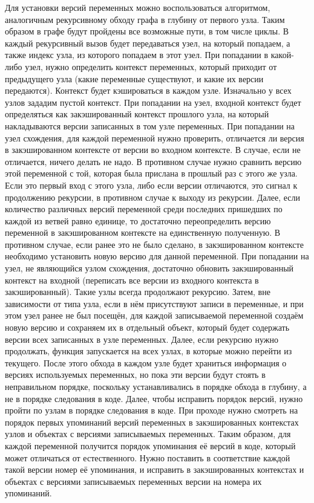 Для установки версий переменных можно воспользоваться алгоритмом, аналогичным рекурсивному обходу графа в глубину от первого узла. Таким образом в графе будут пройдены все возможные пути, в том числе циклы. В каждый рекурсивный вызов будет передаваться узел, на который попадаем, а также индекс узла, из которого попадаем в этот узел. При попадании в какой-либо узел, нужно определить контекст переменных, который приходит от предыдущего узла (какие переменные существуют, и какие их версии передаются). Контекст будет кэшироваться в каждом узле. Изначально у всех узлов зададим пустой контекст. При попадании на узел, входной контекст будет определяться как закэшированный контекст прошлого узла, на который накладываются версии записанных в том узле переменных. При попадании на узел схождения, для каждой переменной нужно проверить, отличается ли версия в закэшированном контексте от версии во входном контексте. В случае, если не отличается, ничего делать не надо. В противном случае нужно сравнить версию этой переменной с той, которая была прислана в прошлый раз с этого же узла. Если это первый вход с этого узла, либо если версии отличаются, это сигнал к продолжению рекурсии, в противном случае к выходу из рекурсии. Далее, если количество различных версий переменной среди последних пришедших по каждой из ветвей равно единице, то достаточно переопределить версию переменной в закэшированном контексте на единственную полученную. В противном случае, если ранее это не было сделано, в закэшированном контексте необходимо установить новую версию для данной переменной. При попадании на узел, не являющийся узлом схождения, достаточно обновить закэшированный контекст на входной (переписать все версии из входного контекста в закэшированный). Такие узлы всегда продолжают рекурсию. Затем, вне зависимости от типа узла, если в нём присутствуют записи в переменные, и при этом узел ранее не был посещён, для каждой записываемой переменной создаём новую версию и сохраняем их в отдельный объект, который будет содержать версии всех записанных в узле переменных. Далее, если рекурсию нужно продолжать, функция запускается на всех узлах, в которые можно перейти из текущего. После этого обхода в каждом узле будет храниться информация о версиях используемых переменных, но пока эти версии будут стоять в неправильном порядке, поскольку устанавливались в порядке обхода в глубину, а не в порядке следования в коде.
Далее, чтобы исправить порядок версий, нужно пройти по узлам в порядке следования в коде. При проходе нужно смотреть на порядок первых упоминаний версий переменных в закэшированных контекстах узлов и объектах с версиями записываемых переменных. Таким образом, для каждой переменной получится порядок упоминания её версий в коде, который может отличаться от естественного. Нужно поставить в соответствие каждой такой версии номер её упоминания, и исправить в закэшированных контекстах и объектах с версиями записываемых переменных версии на номера их упоминаний.
